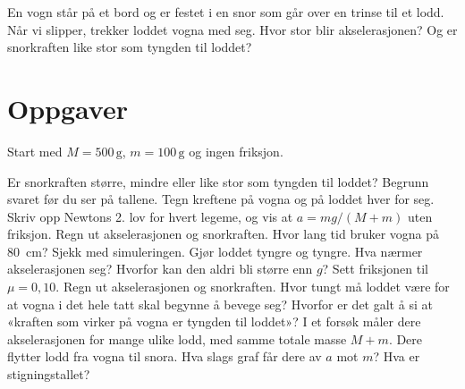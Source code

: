 \documentclass[11pt]{article}
\begin{document}

En vogn står på et bord og er festet i en snor som går over en trinse til et lodd. Når vi slipper, trekker loddet vogna med seg. Hvor stor blir akselerasjonen? Og er snorkraften like stor som tyngden til loddet?

\section*{Oppgaver}

Start med $M = 500\,\mathrm{g}$, $m = 100\,\mathrm{g}$ og ingen friksjon.

\begin{oppgaveliste}
\oppgave {}Er snorkraften større, mindre eller like stor som tyngden til loddet? Begrunn svaret før du ser på tallene.
\svar
\oppgave {}Tegn kreftene på vogna og på loddet hver for seg. Skriv opp Newtons 2. lov for hvert legeme, og vis at $a = mg / (M + m)$ uten friksjon.
\svar
\oppgave {}Regn ut akselerasjonen og snorkraften. Hvor lang tid bruker vogna på 80~cm? Sjekk med simuleringen.
\svar
\oppgave {}Gjør loddet tyngre og tyngre. Hva nærmer akselerasjonen seg? Hvorfor kan den aldri bli større enn $g$?
\svar
\oppgave {}Sett friksjonen til $μ = 0{,}10$. Regn ut akselerasjonen og snorkraften. Hvor tungt må loddet være for at vogna i det hele tatt skal begynne å bevege seg?
\svar
\oppgave {}Hvorfor er det galt å si at «kraften som virker på vogna er tyngden til loddet»?
\svar
\oppgave {}I et forsøk måler dere akselerasjonen for mange ulike lodd, med samme totale masse $M + m$. Dere flytter lodd fra vogna til snora. Hva slags graf får dere av $a$ mot $m$? Hva er stigningstallet?
\svar
\end{oppgaveliste}
\end{document}
